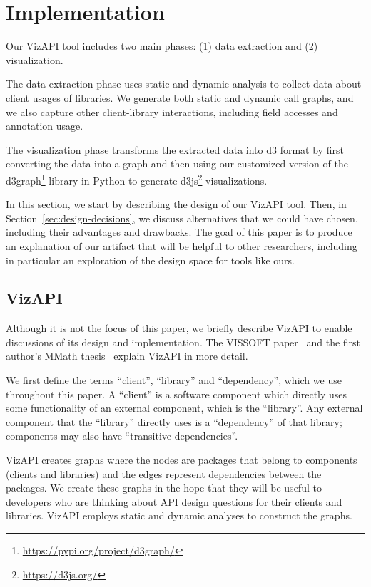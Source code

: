 \section{Implementation}
\label{sec:implementation}
Our VizAPI tool includes two main phases: (1) data extraction and (2)
visualization. 

The data extraction phase uses static and dynamic
analysis to collect data about client usages of libraries. We generate both static and
dynamic call graphs, and we also capture other client-library interactions, including field accesses
and annotation usage. 

The visualization phase transforms the extracted data into d3 format by first converting the data into a graph and then using our customized version
of the d3graph\footnote{\url{https://pypi.org/project/d3graph/}} library in Python to generate d3js\footnote{\url{https://d3js.org/}}
visualizations. 

In this section, we start by describing the design of our VizAPI
tool. Then, in Section~\ref{sec:design-decisions}, we discuss
alternatives that we could have chosen, including their advantages and
drawbacks.  The goal of this paper is to produce an explanation of our
artifact that will be helpful to other researchers, including in
particular an exploration of the design space for tools like ours.

\subsection{VizAPI}
Although it is not the focus of this paper, we briefly describe VizAPI
to enable discussions of its design and implementation.
The VISSOFT paper~\cite{venkatanarayanan22:_vizap}
and the first author's MMath thesis~\cite{venkatanarayanan22:_study_lever_api_usage_patter} explain VizAPI in more detail.

We first define the terms ``client'', ``library'' and ``dependency'', which we use throughout this paper. A ``client'' is a software component which directly uses some functionality of an external component, which is the ``library''. Any external component that the ``library'' directly uses is a ``dependency'' of that library; components may also have ``transitive dependencies''.

VizAPI creates graphs where the nodes are packages that belong to components (clients and libraries) and the edges represent dependencies between the packages. We create these graphs in the hope that they will be useful to developers who are thinking about API design questions for their clients and libraries. VizAPI employs static and dynamic analyses to construct the graphs. 

